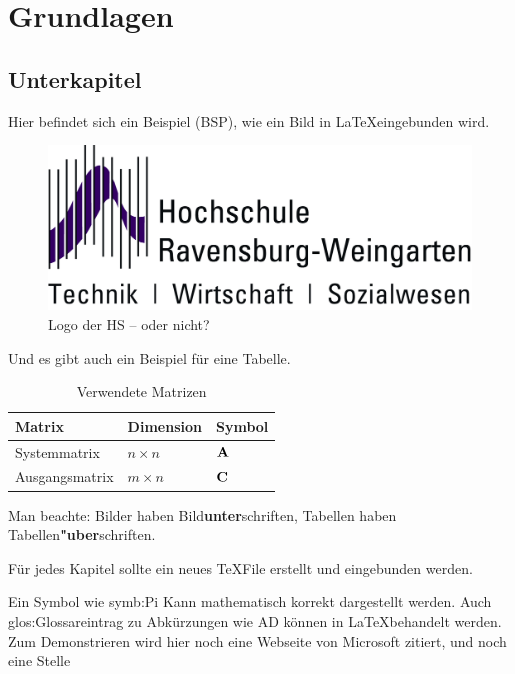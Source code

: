 
\chapter {Grundlagen}  %
\label{cha:grundlagen} %

\section{Unterkapitel} %
\label {sec:Unterkapitel} %

Hier befindet sich ein Beispiel (\gls{BSP}), wie ein Bild in \LaTeX eingebunden wird.
\begin{figure}
 \begin{center}
  \includegraphics*{bilder/HSLogoWGd}
  \caption{Logo der HS -- oder nicht?}
  \label{fig:logo}
 \end{center}
\end{figure}

Und es gibt auch ein Beispiel für eine Tabelle.
\begin{table}
 \begin{center}
 \caption{Verwendete Matrizen}
 \label{matrizen}
  \begin{tabular}{|l|l|l|}
   \hline
   Matrix & Dimension & Symbol \\
   \hline
   Systemmatrix & $n \times n$ & ${\bf A}$  \\
   \hline
   Ausgangsmatrix & $m \times n$ & ${\bf C}$  \\
   \hline
  \end{tabular}
 \end{center}
\end{table}

Man beachte: Bilder haben Bild{\bf unter}schriften, 
Tabellen haben Tabellen{\bf "uber}schriften.

Für jedes Kapitel sollte ein neues \TeX  File erstellt und eingebunden werden. \newline

Ein Symbol wie \gls{symb:Pi} Kann mathematisch korrekt dargestellt werden. Auch \gls{glos:Glossareintrag} zu Abkürzungen wie \gls{AD} können in \LaTeX behandelt werden.
Zum Demonstrieren wird hier noch eine Webseite von Microsoft zitiert\cite{Mid09}, und noch eine Stelle\cite{Mid09b}


 

